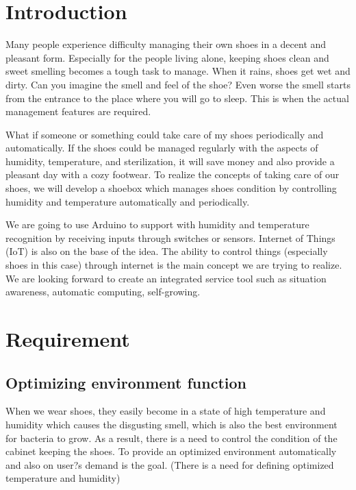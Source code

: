 \documentclass[conference]{IEEEtran}
\begin{document}
\section{Introduction}
Many people experience difficulty managing their own shoes in a decent and pleasant form. Especially for the people living alone, keeping shoes clean and sweet smelling becomes a tough task to manage. When it rains, shoes get wet and dirty. Can you imagine the smell and feel of the shoe? Even worse the smell starts from the entrance to the place where you will go to sleep. This is when the actual management features are required.

What if someone or something could take care of my shoes periodically and automatically. If the shoes could be managed regularly with the aspects of humidity, temperature, and sterilization, it will save money and also provide a pleasant day with a cozy footwear. To realize the concepts of taking care of our shoes, we will develop a shoebox which manages shoes condition by controlling humidity and temperature automatically and periodically. 

We are going to use Arduino to support with humidity and temperature recognition by receiving inputs through switches or sensors. Internet of Things (IoT) is also on the base of the idea. The ability to control things (especially shoes in this case) through internet is the main concept we are trying to realize. We are looking forward to create an integrated service tool such as situation awareness, automatic computing, self-growing. 


\section{Requirement}


\subsection{Optimizing environment function}
When we wear shoes, they easily become in a state of high temperature and humidity which causes the disgusting smell, which is also the best environment for bacteria to grow. As a result, there is a need to control the condition of the cabinet keeping the shoes. To provide an optimized environment automatically and also on user?s demand is the goal. (There is a need for defining optimized temperature and humidity)
\end{document}
